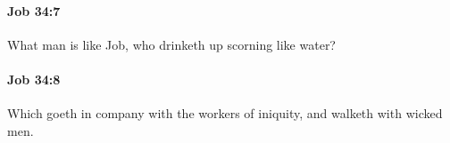 		\paragraph{Job 34:7} %
			\label{JOB-34-7}

			What man is like Job, who drinketh up scorning like water?


		\paragraph{Job 34:8} %
			\label{JOB-34-8}

			Which goeth in company with the workers of iniquity, and walketh with wicked men.


